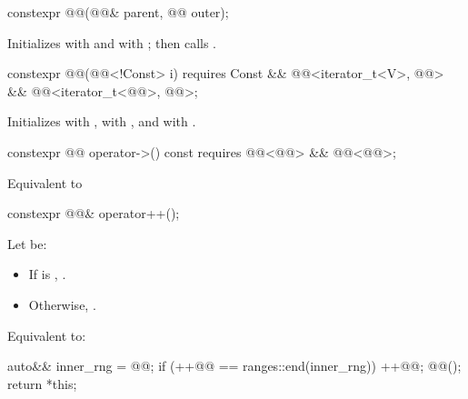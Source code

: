 %
\begin{itemdecl}
constexpr @@(@@& parent, @@ outer);
\end{itemdecl}

\begin{itemdescr}
\pnum
\effects
Initializes  with  and
 with ; then calls .
\end{itemdescr}

%
\begin{itemdecl}
constexpr @@(@@<!Const> i)
  requires Const &&
           @@<iterator_t<V>, @@> &&
           @@<iterator_t<@@>, @@>;
\end{itemdecl}

\begin{itemdescr}
\pnum
\effects
Initializes  with ,
 with , and
 with .
\end{itemdescr}

%
\begin{itemdecl}
constexpr @@ operator->() const
  requires @@<@@> && @@<@@>;
\end{itemdecl}

\begin{itemdescr}
\pnum
\effects
Equivalent to 
\end{itemdescr}

%
\begin{itemdecl}
constexpr @@& operator++();
\end{itemdecl}

\begin{itemdescr}
\pnum
Let  be:
\begin{itemize}
\item If  is , .
\item Otherwise, .
\end{itemize}

\pnum
\effects
Equivalent to:
\begin{codeblock}
auto&& inner_rng = @@;
if (++@@ == ranges::end(inner_rng)) {
  ++@@;
  @@();
}
return *this;
\end{codeblock}
\end{itemdescr}


